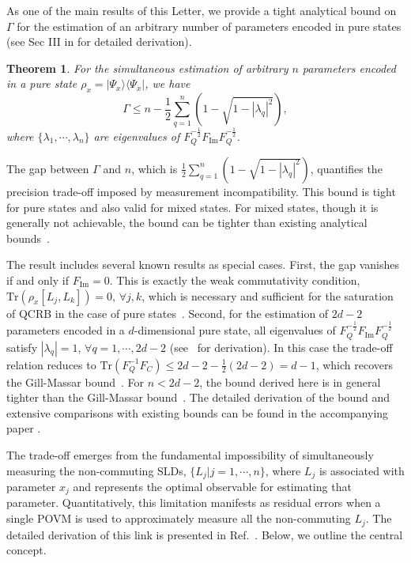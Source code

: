 \documentclass[
aps,
prl,
twocolumn,

superscriptaddress]{revtex4-2}
\newcommand{\ket}[1]{|#1\rangle}
\newcommand{\bra}[1]{\langle #1|}
\newtheorem{theorem}{Theorem}
\begin{document}
As one of the main results of this Letter, we provide a tight analytical bound on $\Gamma$ for the estimation of an arbitrary number of parameters encoded in pure states (see Sec III in \cite{pra} for detailed derivation).
\begin{theorem}\label{theorem}
For the simultaneous estimation of arbitrary $n$ parameters encoded in a pure state $\rho_x=\ket{\Psi_x}\bra{\Psi_x}$, we have
\begin{equation}\label{eq:boundgamma}
\Gamma\leq n-\frac{1}{2}\sum_{q=1}^n (1-\sqrt{1-|\lambda_q|^2}),
\end{equation}
where $\{\lambda_1,\cdots, \lambda_n\}$ are eigenvalues of $F_Q^{-\frac{1}{2}}F_{\text{Im}}F_Q^{-\frac{1}{2}}$.
\end{theorem}
The gap between $\Gamma$ and $n$, which is $\frac{1}{2}\sum_{q=1}^n (1-\sqrt{1-|\lambda_q|^2})$, quantifies the precision trade-off imposed by measurement incompatibility. This bound is tight for pure states and also valid for mixed states.
For mixed states, though it is generally not achievable, the bound can be tighter than existing analytical bounds~\cite{HongzhenPra,HongzhenPRL,GillM00}.

The result includes several known results as special cases. First, the gap vanishes if and only if $F_{\text{Im}}=0$. This is exactly the weak commutativity condition, $\text{Tr}(\rho_x[L_j,L_k])=0$, $\forall j, k$, which is necessary and sufficient for the saturation of QCRB in the case of pure states~\cite{Hole82book,Matsumoto_2002,Luca2017}. Second, for the estimation of $2d-2$ parameters encoded in a $d$-dimensional pure state, all eigenvalues of $F_Q^{-\frac{1}{2}}F_{\text{Im}}F_Q^{-\frac{1}{2}}$ satisfy $|\lambda_q|=1$, $\forall q=1,\cdots, 2d-2$ (see~\cite{pra} for derivation). In this case the trade-off relation reduces to $\text{Tr}(F_Q^{-1}F_C)\leq 2d-2-\frac{1}{2}(2d-2)=d-1$, which recovers the Gill-Massar bound~\cite{GillM00}. For $n<2d-2$, the bound derived here is in general tighter than the Gill-Massar bound~\cite{GillM00}. The detailed derivation of the bound and extensive comparisons with existing bounds can be found in the accompanying paper \cite{pra}.

The trade-off emerges from the fundamental impossibility of simultaneously measuring the non-commuting SLDs, $\{L_j|j=1,\cdots, n\}$, where $L_j$ is associated with parameter $x_j$ and represents the optimal observable for estimating that parameter.
Quantitatively, this limitation manifests as residual errors when a single POVM is used to approximately measure all the non-commuting $L_j$.
The detailed derivation of this link is presented in Ref.~\cite{pra}. Below, we outline the central concept.
\end{document}
